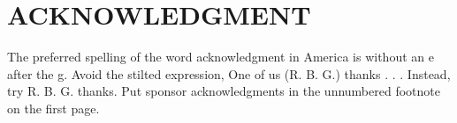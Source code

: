 \documentclass[a4paper, 10pt, conference]{ieeeconf}      %
\begin{document}


\section*{ACKNOWLEDGMENT}

The preferred spelling of the word acknowledgment in America is without an e after the g. Avoid the stilted expression, One of us (R. B. G.) thanks . . .  Instead, try R. B. G. thanks. Put sponsor acknowledgments in the unnumbered footnote on the first page.





\end{document}
